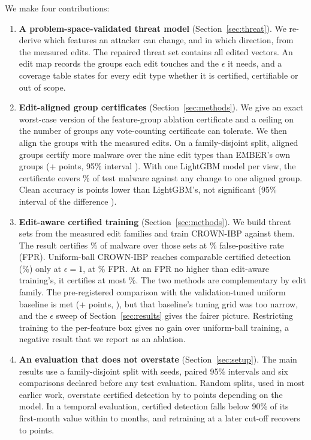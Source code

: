 \documentclass[preprint,12pt,authoryear]{elsarticle}
\begin{document}
We make four contributions:
\begin{enumerate}
\item \textbf{A problem-space-validated threat model} (Section~\ref{sec:threat}). We re-derive which features an attacker can change, and in which direction, from the measured edits. The repaired threat set contains all \PsNEditedInScope{} edited vectors. An edit map records the groups each edit touches and the $\epsilon$ it needs, and a coverage table states for every edit type whether it is certified, certifiable or out of scope.
\item \textbf{Edit-aligned group certificates} (Section~\ref{sec:methods}). We give an exact worst-case version of the feature-group ablation certificate and a ceiling on the number of groups any vote-counting certificate can tolerate. We then align the groups with the measured edits. On a family-disjoint split, aligned groups certify more malware over the nine edit types than EMBER's own groups (+\CmpCDiff{} points, 95\% interval \CmpCInt). With one LightGBM model per view, the certificate covers \FamCertROneLgbmViews\% of test malware against any change to one aligned group. Clean accuracy is \CmpFAbs{} points lower than LightGBM's, not significant (95\% interval of the difference \CmpFInt).
\item \textbf{Edit-aware certified training} (Section~\ref{sec:methods}). We build threat sets from the measured edit families and train CROWN-IBP against them. The result certifies \SwEditCert\% of malware over those sets at \SwEditFpr\% false-positive rate (FPR). Uniform-ball CROWN-IBP reaches comparable certified detection (\SwUnifOneCert\%) only at $\epsilon=1$, at \SwUnifOneFpr\% FPR. At an FPR no higher than edit-aware training's, it certifies at most \SwUnifLowFprCert\%. The two methods are complementary by edit family. The pre-registered comparison with the validation-tuned uniform baseline is met (+\CmpADiff{} points, \CmpAInt), but that baseline's tuning grid was too narrow, and the $\epsilon$ sweep of Section~\ref{sec:results} gives the fairer picture. Restricting training to the per-feature box gives no gain over uniform-ball training, a negative result that we report as an ablation.
\item \textbf{An evaluation that does not overstate} (Section~\ref{sec:setup}). The main results use a family-disjoint split with \NSeedsFam{} seeds, paired 95\% intervals and six comparisons declared before any test evaluation. Random splits, used in most earlier work, overstate certified detection by \RandFamGapMin{} to \RandFamGapMax{} points depending on the model. In a temporal evaluation, certified detection falls below 90\% of its first-month value within \TdMonthsMin{} to \TdMonthsMax{} months, and retraining at a later cut-off recovers \TdRetrainGainMin{} to \TdRetrainGainMax{} points.
\end{enumerate}
\end{document}
